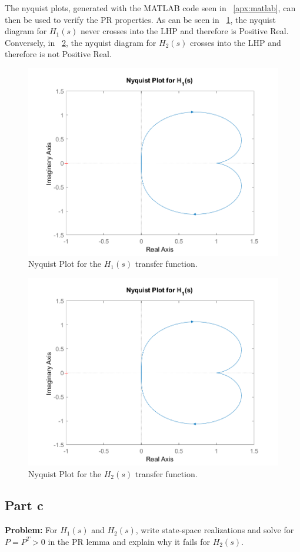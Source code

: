 \documentclass[letter]{article}
\begin{document}
The nyquist plots, generated with the MATLAB code seen in \appendixname \ \ref{apx:matlab}, can then be used to verify the PR properties. As can be seen in \figurename \ \ref{fig:pblm2h1}, the nyquist diagram for $H_1(s)$ never crosses into the LHP and therefore is Positive Real. Conversely, in \figurename \ \ref{fig:pblm2h2}, the nyquist diagram for $H_2(s)$ crosses into the LHP and therefore is not Positive Real.

\begin{figure}[p]
	\centering
	\includegraphics[width=0.7\linewidth]{fig/pblm2_H1}
	\caption{Nyquist Plot for the $H_1(s)$ transfer function.}
	\label{fig:pblm2h1}
\end{figure}


\begin{figure}[p]
	\centering
	\includegraphics[width=0.7\linewidth]{fig/pblm2_H1}
	\caption{Nyquist Plot for the $H_2(s)$ transfer function.}
	\label{fig:pblm2h2}
\end{figure}



\newpage
\subsection{Part c}
\textbf{Problem:}
For $H_1(s)$ and $H_2(s)$, write state-space realizations and solve for $P=P^T > 0$ in the PR lemma and explain why it fails for $H_2(s)$.\\
\end{document}
